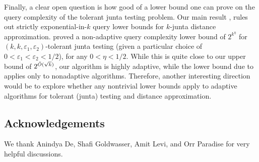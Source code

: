 \documentclass[10pt,a4paper]{article}
\theoremstyle{plain}
\theoremstyle{remark}
\theoremstyle{plain}
\newcommand{\eps}{\varepsilon}
\begin{document}
Finally, a clear open question is how good of a lower bound one can prove on the query complexity of the tolerant junta testing problem. Our main result , rules out strictly exponential-in-$k$ query lower bounds for $k$-junta distance approximation. \cite{junta-lbs-PRW20} proved a non-adaptive query complexity lower bound of $2^{k^\eta}$ for $(k, k, \eps_1,\eps_2)$-tolerant junta testing (given a particular choice of $0 < \eps_1 < \eps_2 < 1/2$), for any $0<\eta<1/2$. While this is quite close to our upper bound of $2^{\Tilde{O}(\sqrt{k})}$, our algorithm is highly adaptive, while the lower bound due to \cite{junta-lbs-PRW20} applies only to nonadaptive algorithms. 
Therefore, another interesting direction would be to explore whether any nontrivial lower bounds  apply to adaptive algorithms for tolerant (junta) testing and distance approximation.

\subsection*{Acknowledgements}
We thank Anindya De, Shafi Goldwasser, Amit Levi, and Orr Paradise for very helpful discussions.

\appendix 
\end{document}
